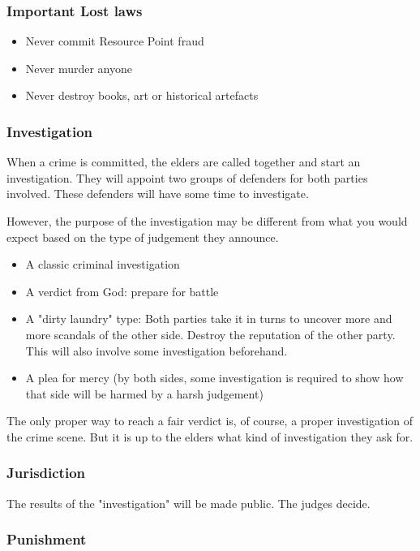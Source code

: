 \subsubsection{Important Lost laws}

\begin{itemize}
\item{Never commit Resource Point fraud}
\item{Never murder anyone}
\item{Never destroy books, art or historical artefacts}
\end{itemize}

\subsubsection{Investigation}

When a crime is committed, the elders are called together and start an investigation. They will appoint two groups of defenders for both parties involved. These defenders will have some time to investigate.

However, the purpose of the investigation may be different from what you would expect based on the type of judgement they announce.

\begin{itemize}
    \item A classic criminal investigation
    \item A verdict from God: prepare for battle
    \item A "dirty laundry" type: Both parties take it in turns to uncover more and more scandals of the other side. Destroy the reputation of the other party. This will also involve some investigation beforehand.
    \item A plea for mercy (by both sides, some investigation is required to show how that side will be harmed by a harsh judgement)
\end{itemize}

The only proper way to reach a fair verdict is, of course, a proper investigation of the crime scene. But it is up to the elders what kind of investigation they ask for.

\subsubsection{Jurisdiction}

The results of the "investigation" will be made public. The judges decide.

\subsubsection{Punishment}

